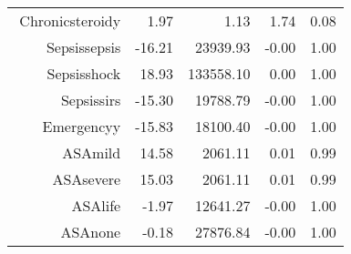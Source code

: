 \begin{tabular}{rrrrr}
$$  Chronic\-steroid\-y & 1.97 & 1.13 & 1.74 & 0.08 \\ 
  Sepsis\-sepsis & -16.21 & 23939.93 & -0.00 & 1.00 \\ 
  Sepsis\-shock & 18.93 & 133558.10 & 0.00 & 1.00 \\ 
  Sepsis\-sirs & -15.30 & 19788.79 & -0.00 & 1.00 \\ 
  Emergency\-y & -15.83 & 18100.40 & -0.00 & 1.00 \\ 
  ASA\-mild & 14.58 & 2061.11 & 0.01 & 0.99 \\ 
  ASA\-severe & 15.03 & 2061.11 & 0.01 & 0.99 \\ 
  ASA\-life & -1.97 & 12641.27 & -0.00 & 1.00 \\ 
  ASA\-none & -0.18 & 27876.84 & -0.00 & 1.00 \\ 
   \hline
\end{tabular}

